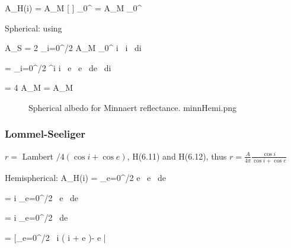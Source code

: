 \qb A_H(i) =  A_M  [ ] \mu_0^{\nu}  
=  A_M  \mu_0^{}  \qe

Spherical: using 

\qb A_S = 2 \int_{i=0}^{\pi/2} A_M  \mu_0^{}  \cdot  \cos i \ \sin i  \ di \qe

\qb =  \int_{i=0}^{\pi/2} \cos^\nu i  \cdot \sin i \ \cos e \ \sin e \ de \ di  \qe





\qb = 4 \pi  A_M     \left[_{i=0}^{\pi/2} \ - \frac{\cos^{\nu+1} i}{\nu+1} \right| \qe

\qb = 4 \pi  A_M   \left[ \frac{1}{\nu+1} \right]  [\frac{1}{\nu+1}] = A_M  \qe

\begin{figure}[!ht] 
\caption [Minnaert $A_S$]{Spherical albedo for Minnaert reflectance.
\label{minnHemi}  minnHemi.png }
\end{figure} 

\subsubsection{Lommel-Seeliger} 

 $r= $ Lambert $/ 4(\cos i + \cos e) $, H(6.11) and H(6.12), 
thus $r= \frac{A}{4 \pi} \frac{\cos i}{\cos i+ \cos e} $

Hemispherical:
\qb A_H(i) =  \int_{e=0}^{\pi/2}    \cdot  \cos e \ \sin e \ de \qe

\qb  =   \cos i \int_{e=0}^{\pi/2}  \ \sin e \ de \qe

\qbn  =  \cos i \int_{e=0}^{\pi/2}  \ de 

\qb  =  \left[_{e=0}^{\pi/2} \  \cos i \ln ( \cos i + \cos e )- \cos e  \right| \qe

